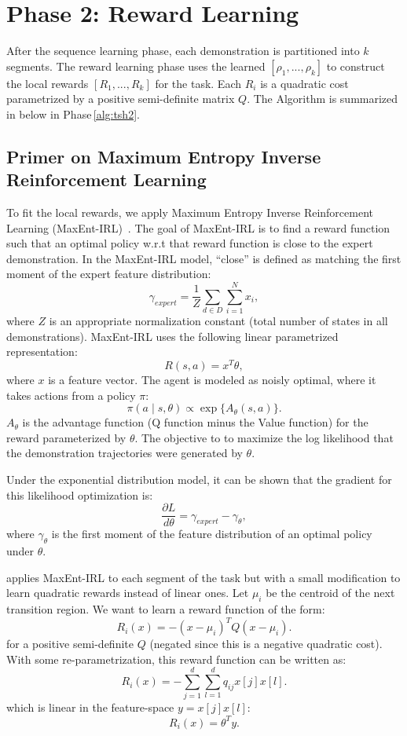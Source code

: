
\section{Phase 2: Reward Learning}\label{sec:reward}
After the sequence learning phase, each demonstration is partitioned into $k$ segments.
The reward learning phase uses the learned $[\rho_1,...,\rho_k]$ to construct the local rewards $[R_1,...,R_k]$ for the task.
Each $R_i$ is a quadratic cost parametrized by a positive semi-definite matrix $Q$.
The Algorithm is summarized in below in Phase\,\ref{alg:tsh2}.


\subsection{Primer on Maximum Entropy Inverse Reinforcement Learning}
To fit the local rewards, we apply Maximum Entropy Inverse Reinforcement Learning (MaxEnt-IRL)~\citep{DBLP:conf/aaai/ZiebartMBD08}. 
The goal of MaxEnt-IRL is to find a reward function such that an optimal policy w.r.t that reward function is close to the
expert demonstration.
In the MaxEnt-IRL model, ``close'' is defined as matching the first moment of the expert feature distribution:
\[
\gamma_{expert} = \frac{1}{Z} \sum_{d \in D} \sum_{i=1}^N x_i,
\]
where $Z$ is an appropriate normalization constant (total number of states in all demonstrations).
MaxEnt-IRL uses the following linear parametrized representation:
\[
R(s,a) = x^T \theta,
\]
where $x$ is a feature vector.
The agent is modeled as noisly optimal, where it takes actions from a policy $\pi$:
\[
\pi(a \mid s, \theta) \propto \exp\{A_\theta(s,a)\}.
\]
$A_\theta$ is the advantage function (Q function minus the Value function) for the reward parameterized by $\theta$.
The objective to to maximize the log likelihood that the demonstration trajectories were generated by  $\theta$.

Under the exponential distribution model, it can be shown that the gradient for this likelihood optimization is:
\[
\frac{\partial L}{d \theta} = \gamma_{expert} - \gamma_{\theta},
\]
where $\gamma_{\theta}$ is the first moment of the feature distribution of an optimal policy under $\theta$.

\hirl applies MaxEnt-IRL to each segment of the task but with a small modification to learn quadratic rewards instead of linear ones. 
Let $\mu_i$ be the centroid of the next transition region.
We want to learn a reward function of the form:
\[
R_i(x) = -(x-\mu_i)^T Q (x-\mu_i).
\]
for a positive semi-definite $Q$ (negated since this is a negative quadratic cost).
With some re-parametrization, this reward function can be written as:
\[
R_i(x) = -\sum_{j=1}^d \sum_{l=1}^d q_{ij} x[j] x[l].
\]
which is linear in the feature-space $y = x[j] x[l]$:
\[
R_i(x) = \theta^T y.
\]

